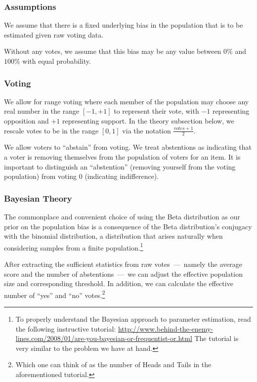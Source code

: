 \documentclass{sigchi}
\begin{document}
\subsubsection{Assumptions}
We assume that there is a fixed underlying bias in the population that is to be estimated given raw voting data.

Without any votes, we assume that this bias may be any value between $0\%$ and $100\%$ with equal probability.

\subsubsection{Voting}
We allow for range voting where each member of the population may choose any real number in the range $[-1,+1]$ to
represent their vote, with $-1$ representing opposition and $+1$ representing support.
In the theory subsection below, we rescale votes to be in the range $[0,1]$ via the notation $\frac{votes + 1}{2}$.

We allow voters to ``abstain'' from voting.
We treat abstentions as indicating that a voter is removing themselves from the population of voters for an item.
It is important to distinguish an ``abstention'' (removing yourself from the voting population) from voting $0$
(indicating indifference).

\subsubsection{Bayesian Theory}

The commonplace and convenient choice of using the Beta distribution as our prior on the population bias is a
consequence of the Beta distribution's conjugacy with the binomial distribution, a distribution that arises
naturally when considering samples from a finite population.\footnote{To
properly understand the Bayesian approach to parameter estimation, read the following instructive tutorial:
\url{http://www.behind-the-enemy-lines.com/2008/01/are-you-bayesian-or-frequentist-or.html}
The tutorial is very similar to the problem we have at hand.}

After extracting the sufficient statistics from raw votes~---~namely the average score and the number of
abstentions~---~we can adjust the effective population size and corresponding threshold.
In addition, we can calculate the effective number of ``yes'' and ``no'' votes.\footnote{Which one can think
of as the number of Heads and Tails in the aforementioned tutorial.}
\end{document}
